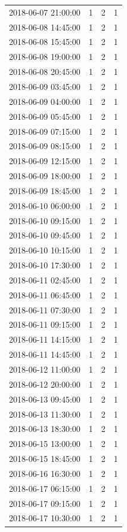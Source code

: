 \begin{tabular}{lrrr}
2018-06-07 21:00:00 & 1 & 2 & 1 \\
2018-06-08 14:45:00 & 1 & 2 & 1 \\
2018-06-08 15:45:00 & 1 & 2 & 1 \\
2018-06-08 19:00:00 & 1 & 2 & 1 \\
2018-06-08 20:45:00 & 1 & 2 & 1 \\
2018-06-09 03:45:00 & 1 & 2 & 1 \\
2018-06-09 04:00:00 & 1 & 2 & 1 \\
2018-06-09 05:45:00 & 1 & 2 & 1 \\
2018-06-09 07:15:00 & 1 & 2 & 1 \\
2018-06-09 08:15:00 & 1 & 2 & 1 \\
2018-06-09 12:15:00 & 1 & 2 & 1 \\
2018-06-09 18:00:00 & 1 & 2 & 1 \\
2018-06-09 18:45:00 & 1 & 2 & 1 \\
2018-06-10 06:00:00 & 1 & 2 & 1 \\
2018-06-10 09:15:00 & 1 & 2 & 1 \\
2018-06-10 09:45:00 & 1 & 2 & 1 \\
2018-06-10 10:15:00 & 1 & 2 & 1 \\
2018-06-10 17:30:00 & 1 & 2 & 1 \\
2018-06-11 02:45:00 & 1 & 2 & 1 \\
2018-06-11 06:45:00 & 1 & 2 & 1 \\
2018-06-11 07:30:00 & 1 & 2 & 1 \\
2018-06-11 09:15:00 & 1 & 2 & 1 \\
2018-06-11 14:15:00 & 1 & 2 & 1 \\
2018-06-11 14:45:00 & 1 & 2 & 1 \\
2018-06-12 11:00:00 & 1 & 2 & 1 \\
2018-06-12 20:00:00 & 1 & 2 & 1 \\
2018-06-13 09:45:00 & 1 & 2 & 1 \\
2018-06-13 11:30:00 & 1 & 2 & 1 \\
2018-06-13 18:30:00 & 1 & 2 & 1 \\
2018-06-15 13:00:00 & 1 & 2 & 1 \\
2018-06-15 18:45:00 & 1 & 2 & 1 \\
2018-06-16 16:30:00 & 1 & 2 & 1 \\
2018-06-17 06:15:00 & 1 & 2 & 1 \\
2018-06-17 09:15:00 & 1 & 2 & 1 \\
2018-06-17 10:30:00 & 1 & 2 & 1 \\

\end{tabular}
